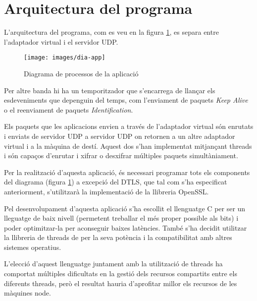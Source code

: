 \section{Arquitectura del programa}
L'arquitectura del programa, com es veu en la figura \ref{F:dia-app}, es separa entre l'adaptador virtual i el servidor UDP.
\begin{figure}[htb]
\centering
\texttt{[image: images/dia-app]}
\caption{Diagrama de processos de la aplicació}
\label{F:dia-app}
\end{figure}
\label{arch-temp}
Per altre banda hi ha un temporitzador que s'encarrega de llançar els esdeveniments que depenguin del temps, com l'enviament de paquets \emph{Keep Alive} o el reenviament de paquets \emph{Identification}.

Els paquets que les aplicacions envien a través de l'adaptador virtual són enrutats i enviats de servidor UDP a servidor UDP on retornen a un altre adaptador virtual i a la màquina de destí. Aquest dos s'han implementat mitjançant threads i són capaços d'enrutar i xifrar o desxifrar múltiples paquets simultàniament.

Per la realització d'aquesta aplicació, és necessari programar tots els components del diagrama (figura \ref{F:dia-app}) a excepció del DTLS, que tal com s'ha especificat anteriorment, s'utilitzarà la implementació de la llibreria OpenSSL.

Pel desenvolupament d'aquesta aplicació s'ha escollit el llenguatge C per ser un lleguatge de baix nivell (permetent treballar el més proper possible als bits) i poder optimitzar-la per aconseguir baixes latències. També s'ha decidit utilitzar la llibreria de threads de  per la seva potència i la compatibilitat amb altres sistemes operatius.

L'elecció d'aquest llenguatge juntament amb la utilització de threads ha comportat múltiples dificultats en la gestió dels recursos compartits entre els diferents threads, però el resultat hauria d'aprofitar millor els recursos de les màquines node.

